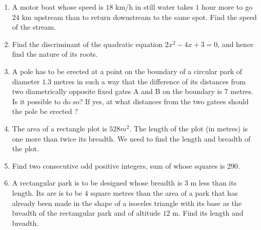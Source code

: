 \begin{enumerate}[label=\thesubsection.\arabic*,ref=\thesubsection.\theenumi,resume*]
\item A motor boat whose speed is $18$ km/h in still water takes $1$ hour more to go $24$ km upstream than to return downstream to the same spot. Find the speed of the stream.
\item Find the discriminant of the quadratic equation $2x^2-4x+3 = 0$, and hence find the nature of its roots.
\item A pole has to be erected at a point on the boundary of a circular park of diameter $1.3$ metres in such a way that the difference of its distances from two diametrically opposite fixed gates A and B on the boundary is $7$ metres. Is it possible to do so? If yes, at what distances from the two gatees should the pole be erected ?
\item The area of a rectangle plot is $528 m^2$. The length of the plot (in metres) is one more than twice its breadth. We need to find the length and breadth of the plot.
\item Find two consecutive odd positive integers, sum of whose squares is $290$.
\item A rectangular park is to be designed whose breadth is $3$ m less than its length. Its are is to be $4$ square metres than the area of a park that has already been made in the shape of a isoceles triangle with its base as  the breadth of the rectangular park and of altitude $12$ m. Find its length and breadth.
\end{enumerate}

